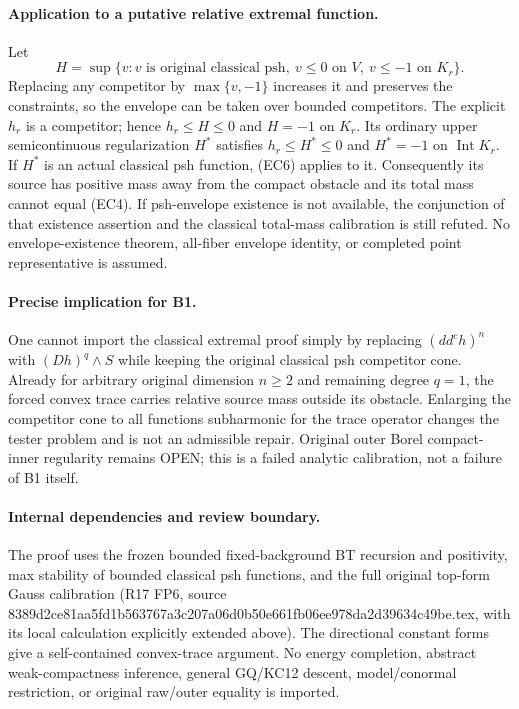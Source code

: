 \paragraph{Application to a putative relative extremal function.}
Let
\[
 H=\sup\{v:v\text{ is original classical psh},\ v\le0\text{ on }V,
                                      \ v\le-1\text{ on }K_r\}.
\]
Replacing any competitor by $\max\{v,-1\}$ increases it and preserves
the constraints, so the envelope can be taken over bounded competitors.
The explicit $h_r$ is a competitor; hence $h_r\le H\le0$ and $H=-1$ on
$K_r$. Its ordinary upper semicontinuous regularization $H^*$ satisfies
$h_r\le H^*\le0$ and $H^*=-1$ on $\operatorname{Int}K_r$.
If $H^*$ is an actual classical psh function, (EC6) applies to it.
Consequently its source has positive mass away from the compact obstacle
and its total mass cannot equal (EC4). If psh-envelope existence is not
available, the conjunction of that existence assertion and the classical
total-mass calibration is still refuted. No envelope-existence theorem,
all-fiber envelope identity, or completed point representative is assumed.

\paragraph{Precise implication for B1.}
One cannot import the classical extremal proof simply by replacing
$(dd^c h)^n$ with $(Dh)^q\wedge S$ while keeping the original classical
psh competitor cone. Already for arbitrary original dimension $n\ge2$
and remaining degree $q=1$, the forced convex trace carries relative
source mass outside its obstacle. Enlarging the competitor cone to all
functions subharmonic for the trace operator changes the tester problem
and is not an admissible repair. Original outer Borel compact-inner
regularity remains OPEN; this is a failed analytic calibration, not a
failure of B1 itself.

\paragraph{Internal dependencies and review boundary.}
The proof uses the frozen bounded fixed-background BT recursion and
positivity, max stability of bounded classical psh functions, and the
full original top-form Gauss calibration (R17 FP6, source
8389d2ce81aa5fd1b563767a3c207a06d0b50e661fb06ee978da2d39634c49be.tex,
with its local calculation explicitly extended above). The directional
constant forms give a self-contained convex-trace argument. No energy
completion, abstract weak-compactness inference, general GQ/KC12 descent,
model/conormal restriction, or original raw/outer equality is imported.
